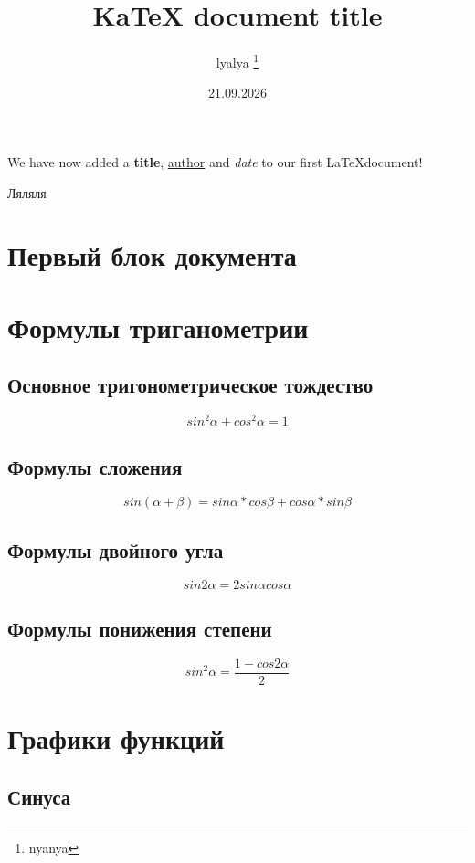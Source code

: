 \documentclass[11pt, latterpaper]{article}
\title{KaTeX document title}
\author{lyalya \thanks{nyanya}}
\date{21.09.2026}
\begin{document}
\maketitle
We have now added a \textbf{title}, \underline{author} and \textit{date} to our first \LaTeX document!

Ляляля
\section{Первый блок документа}

\section{Формулы триганометрии}
\subsection{Основное тригонометрическое тождество}
 $$sin^2 \alpha + cos^2 \alpha = 1 $$
\subsection{Формулы сложения}
$$sin(\alpha + \beta)=sin\alpha*cos\beta+cos\alpha*sin\beta$$
\subsection{Формулы двойного угла}
$$sin2\alpha=2sin\alpha cos\alpha$$
\subsection{Формулы понижения степени}
$$sin^2\alpha=\frac{1-cos2\alpha}{2}$$
\section{Графики функций}
\subsection{Синуса}
\begin{center}
\end{center}
\end{document}
